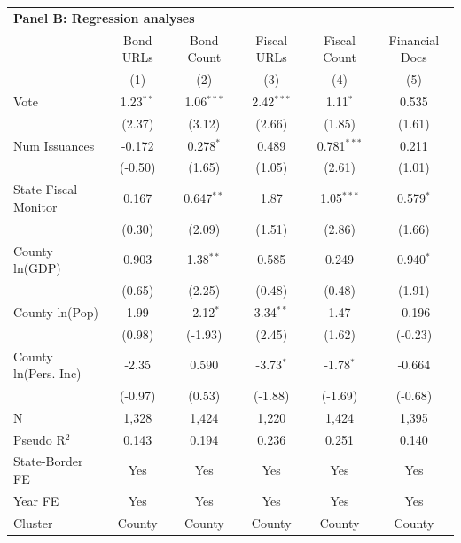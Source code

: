 \begingroup
\centering
\begin{tabular*}{\textwidth}{@{\extracolsep{\fill}}lccccc}
\multicolumn{6}{l}{\textbf{Panel B: Regression analyses}}\\

\addlinespace
   \toprule
                        & Bond URLs   & Bond Count   & Fiscal URLs  & Fiscal Count  & Financial Docs\\  
                        & (1)         & (2)          & (3)          & (4)           & (5)\\  
   \midrule 
   Vote                 & 1.23$^{**}$ & 1.06$^{***}$ & 2.42$^{***}$ & 1.11$^{*}$    & 0.535\\   
                        & (2.37)      & (3.12)       & (2.66)       & (1.85)        & (1.61)\\   
   Num Issuances        & -0.172      & 0.278$^{*}$  & 0.489        & 0.781$^{***}$ & 0.211\\   
                        & (-0.50)    & (1.65)       & (1.05)       & (2.61)        & (1.01)\\   
   State Fiscal Monitor & 0.167       & 0.647$^{**}$ & 1.87         & 1.05$^{***}$  & 0.579$^{*}$\\   
                        & (0.30)     & (2.09)       & (1.51)       & (2.86)        & (1.66)\\   
   County ln(GDP)       & 0.903       & 1.38$^{**}$  & 0.585        & 0.249         & 0.940$^{*}$\\   
                        & (0.65)     & (2.25)       & (0.48)      & (0.48)       & (1.91)\\   
   County ln(Pop)       & 1.99        & -2.12$^{*}$  & 3.34$^{**}$  & 1.47          & -0.196\\   
                        & (0.98)     & (-1.93)      & (2.45)       & (1.62)        & (-0.23)\\   
   County ln(Pers. Inc) & -2.35       & 0.590        & -3.73$^{*}$  & -1.78$^{*}$   & -0.664\\   
                        & (-0.97)    & (0.53)      & (-1.88)      & (-1.69)       & (-0.68)\\   
   \hline
   N         & 1,328       & 1,424        & 1,220        & 1,424         & 1,395\\  
   Pseudo R$^2$         & 0.143       & 0.194        & 0.236        & 0.251         & 0.140\\  
   State-Border FE      & Yes         & Yes          & Yes          & Yes           & Yes\\  
   Year FE              & Yes         & Yes          & Yes          & Yes           & Yes\\  
   Cluster              & County & County & County & County & County\\  
   \bottomrule
\end{tabular*}
\par\endgroup
